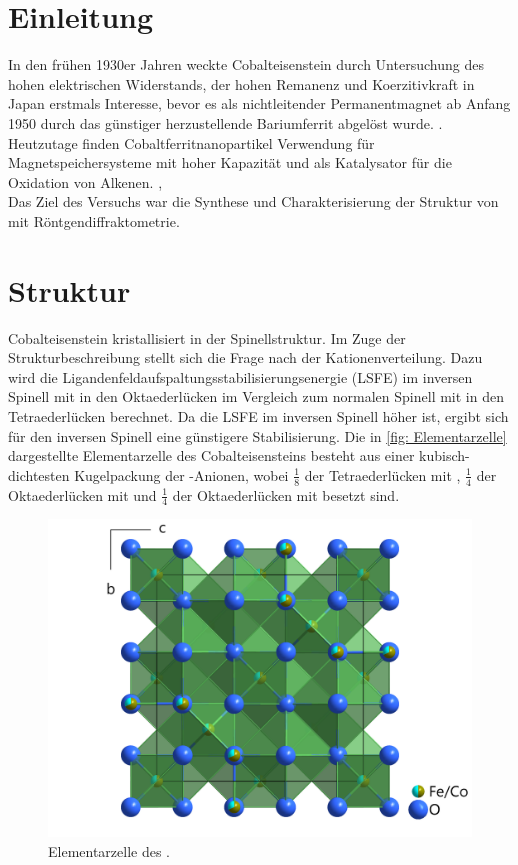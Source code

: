 \documentclass[a4paper,12pt,bibliography=totocnumbered]{scrartcl}
\begin{document}
\clearpage

\renewcommand{\thepage}{\arabic{page}}
\setcounter{page}{1}


\section{Einleitung}
In den frühen 1930er Jahren weckte Cobalteisenstein durch Untersuchung des hohen elektrischen Widerstands, der hohen Remanenz und Koerzitivkraft in Japan erstmals Interesse, bevor es als nichtleitender Permanentmagnet ab Anfang 1950 durch das günstiger herzustellende Bariumferrit abgelöst wurde.
\cite{History}.
Heutzutage finden Cobaltferritnanopartikel Verwendung für Magnetspeichersysteme mit hoher Kapazität und als Katalysator für die Oxidation von Alkenen. \cite{Rieck},\cite{Kat} \\
Das Ziel des Versuchs war die Synthese und Charakterisierung der Struktur von  mit Röntgendiffraktometrie.

\section{Struktur}
Cobalteisenstein kristallisiert in der Spinellstruktur. \cite{Rieck} 
Im Zuge der Strukturbeschreibung stellt sich die Frage nach der Kationenverteilung. 
Dazu wird die Ligandenfeldaufspaltungsstabilisierungsenergie (LSFE) im inversen Spinell mit  in den Oktaederlücken im Vergleich zum normalen Spinell mit  in den Tetraederlücken berechnet. 
Da die LSFE im inversen Spinell höher ist, ergibt sich für den inversen Spinell eine günstigere Stabilisierung.
Die in \autoref{fig: Elementarzelle} dargestellte Elementarzelle des Cobalteisensteins besteht aus einer kubisch-dichtesten Kugelpackung der -Anionen, wobei $\frac{1}{8}$ der Tetraederlücken mit , 
$\frac{1}{4}$ der Oktaederlücken mit  und $\frac{1}{4}$ der Oktaederlücken mit  besetzt sind. \\

\begin{figure}[H]
    \centering
    \includegraphics[width=0.75 \linewidth ]{Bilder/Elementarzelle.png}
    \caption{Elementarzelle des .\cite{Rieck}}
    \label{fig: Elementarzelle}
\end{figure}
\end{document}
